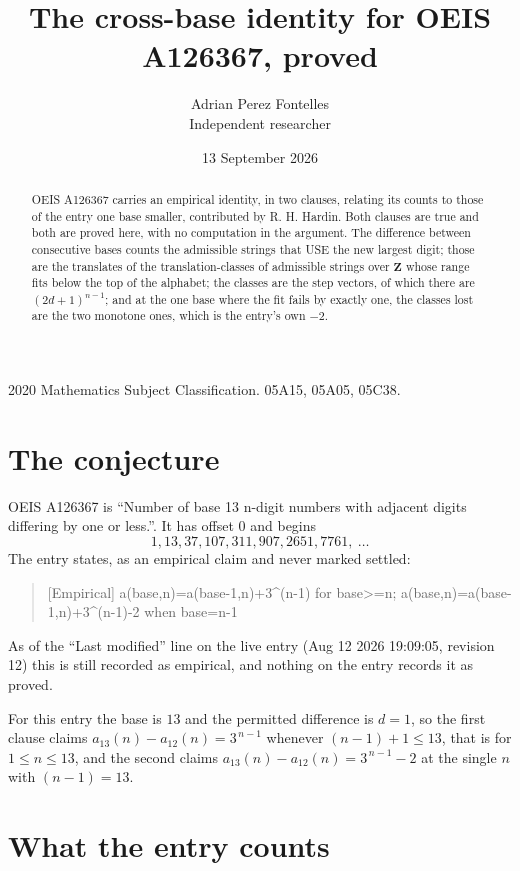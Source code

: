 \documentclass[11pt,a4paper]{article}
\title{The cross-base identity for OEIS A126367, proved}
\author{Adrian Perez Fontelles\\ \small Independent researcher}
\date{13 September 2026}
\theoremstyle{plain}
\theoremstyle{definition}
\begin{document}
\maketitle

\begin{abstract}
OEIS A126367 carries an empirical identity, in two clauses, relating its counts to those of the
entry one base smaller, contributed by R. H. Hardin. Both clauses are true and both are proved
here, with no computation in the argument. The difference between consecutive bases counts the
admissible strings that USE the new largest digit; those are the translates of the
translation-classes of admissible strings over $\mathbf{Z}$ whose range fits below the top of
the alphabet; the classes are the step vectors, of which there are $(2d+1)^{n-1}$; and at the
one base where the fit fails by exactly one, the classes lost are the two monotone ones, which
is the entry's own $-2$.
\end{abstract}

\noindent\small 2020 Mathematics Subject Classification. 05A15, 05A05, 05C38.\normalsize

\section{The conjecture}

OEIS A126367 is ``Number of base 13 n-digit numbers with adjacent digits differing by one or less.''. It has offset $0$ and begins
\[
1, 13, 37, 107, 311, 907, 2651, 7761,\ \dots
\]
The entry states, as an empirical claim and never marked settled:
\begin{quote}
[Empirical] a(base,n)=a(base-1,n)+3\textasciicircum{}(n-1) for base>=n; a(base,n)=a(base-1,n)+3\textasciicircum{}(n-1)-2 when base=n-1
\end{quote}
As of the ``Last modified'' line on the live entry (Aug 12 2026 19:09:05, revision 12)
this is still recorded as empirical, and nothing on the entry records it as proved.

For this entry the base is $13$ and the permitted difference is $d=1$, so the first clause
claims $a_{13}(n)-a_{12}(n)=3^{\,n-1}$ whenever $(n-1)+1\le13$, that is for
$1\le n\le13$, and the second claims $a_{13}(n)-a_{12}(n)=3^{\,n-1}-2$ at the single
$n$ with $(n-1)=13$.

\section{What the entry counts}
\end{document}
